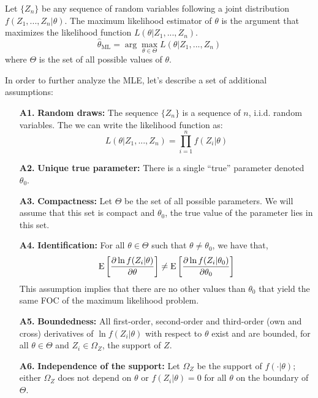 \begin{definition}
Let $\{Z_n\}$ be any sequence of random variables following a joint distribution $f(Z_1, ..., Z_n\vert \theta)$. The maximum likelihood estimator of $\theta$ is the argument that maximizes the likelihood function $L(\theta\vert Z_1, ..., Z_n)$. $$\hat \theta_{\text{ML}} = \operatorname{arg}\max_{\theta \in \Theta} L(\theta\vert Z_1, ..., Z_n) $$ where $\Theta$ is the set of all possible values of $\theta$.
\end{definition}

\begin{definition}
In order to further analyze the MLE, let's describe a set of additional assumptions:
\begin{itemize}
\item[\textbf{A1.}]\textbf{Random draws:} The sequence $\{Z_n\}$ is a sequence of $n$, i.i.d. random variables. The we can write the likelihood function as:$$ L(\theta\vert Z_1, ..., Z_n) = \prod_{i=1}^{n} f(Z_i\vert \theta) $$

\item[\textbf{A2.}]\textbf{Unique true parameter:} There is a single ``true'' parameter denoted $\theta_0$.

\item[\textbf{A3.}]\textbf{Compactness:} Let $\Theta$ be the set of all possible parameters. We will assume that this set is compact and $\theta_0$, the true value of the parameter lies in this set.

\item[\textbf{A4.}]\textbf{Identification:} For all $\theta \in \Theta$ such that $\theta \neq \theta_0$, we have that,$$ \operatorname{E}\left[\frac{\partial \ln f(Z_i\vert \theta)}{\partial \theta}\right] \neq \operatorname{E}\left[\frac{\partial \ln f(Z_i\vert \theta_0)}{\partial \theta_0}\right] $$ This assumption implies that there are no other values than $\theta_0$ that yield the same FOC of the maximum likelihood problem.

\item[\textbf{A5.}]\textbf{Boundedness:} All first-order, second-order and third-order (own and cross) derivatives of $\ln f(Z_i\vert\theta)$ with respect to $\theta$ exist and are bounded, for all $\theta \in \Theta$ and $Z_i \in \Omega_Z$, the support of $Z$.

\item[\textbf{A6.}]\textbf{Independence of the support:} Let $\Omega_Z$ be the support of $f(\cdot\vert\theta)$; either $\Omega_Z$ does not depend on $\theta$ or $f(Z_i\vert \theta) = 0$ for all $\theta$ on the boundary of $\Theta$.
\end{itemize}
\end{definition}

